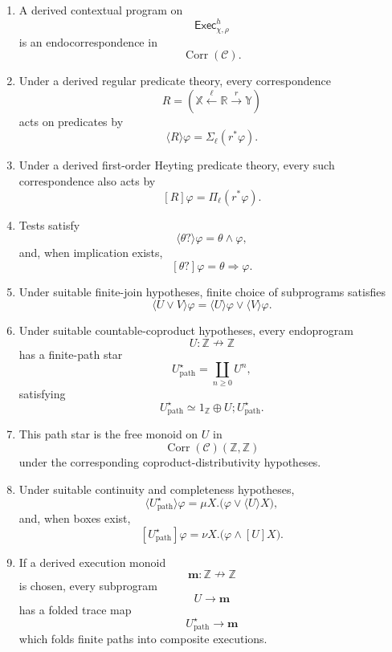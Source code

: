\begin{theorem}
\begin{enumerate}
\item A derived contextual program on
\[
\mathsf{Exec}^h_{\chi,\rho}
\]
is an endocorrespondence in
\[
\operatorname{Corr}(\mathcal C).
\]

\item Under a derived regular predicate theory, every correspondence
\[
R=(\mathbb X\xleftarrow{\ell}\mathbb R\xrightarrow{r}\mathbb Y)
\]
acts on predicates by
\[
\langle R\rangle\varphi
=
\Sigma_\ell(r^\ast\varphi).
\]

\item Under a derived first-order Heyting predicate theory, every such
correspondence also acts by
\[
[R]\varphi
=
\Pi_\ell(r^\ast\varphi).
\]

\item Tests satisfy
\[
\langle\theta?\rangle\varphi
=
\theta\wedge\varphi,
\]
and, when implication exists,
\[
[\theta?]\varphi
=
\theta\Rightarrow\varphi.
\]

\item Under suitable finite-join hypotheses, finite choice of subprograms
satisfies
\[
\langle U\vee V\rangle\varphi
=
\langle U\rangle\varphi
\vee
\langle V\rangle\varphi.
\]

\item Under suitable countable-coproduct hypotheses, every endoprogram
\[
U:\mathbb Z\nrightarrow\mathbb Z
\]
has a finite-path star
\[
U^\star_{\mathrm{path}}
=
\coprod_{n\ge0}U^n,
\]
satisfying
\[
U^\star_{\mathrm{path}}
\simeq
1_{\mathbb Z}\oplus U;U^\star_{\mathrm{path}}.
\]

\item This path star is the free monoid on \(U\) in
\[
\operatorname{Corr}(\mathcal C)(\mathbb Z,\mathbb Z)
\]
under the corresponding coproduct-distributivity hypotheses.

\item Under suitable continuity and completeness hypotheses,
\[
\langle U^\star_{\mathrm{path}}\rangle\varphi
=
\mu X.\bigl(\varphi\vee\langle U\rangle X\bigr),
\]
and, when boxes exist,
\[
[U^\star_{\mathrm{path}}]\varphi
=
\nu X.\bigl(\varphi\wedge[U]X\bigr).
\]

\item If a derived execution monoid
\[
\mathbf m:\mathbb Z\nrightarrow\mathbb Z
\]
is chosen, every subprogram
\[
U\to\mathbf m
\]
has a folded trace map
\[
U^\star_{\mathrm{path}}\to\mathbf m
\]
which folds finite paths into composite executions.
\end{enumerate}
\end{theorem}

